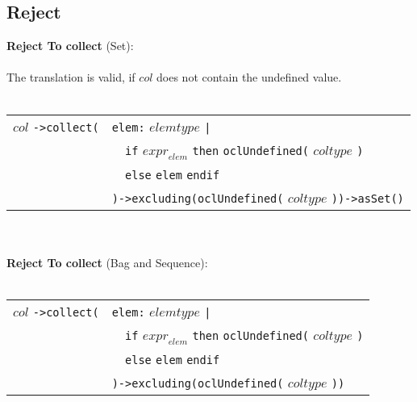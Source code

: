 \subsection{Reject}
{\bf Reject To collect} (Set):\\\\
The translation is valid, if $\mathit{col}$ does not
contain the undefined value.\\\\
\begin{tabular}{ll}
$\mathit{col}$ \verb+->collect(+&
\verb+elem+\verb+:+ $\mathit{elemtype}$ \verb+|+\\
&\verb+  +\verb+if+ $\mathit{expr}_{\mathit{elem}}$ \verb+then+
\verb+oclUndefined(+
$\mathit{coltype}$ \verb+)+\\
&\verb+  +\verb+else+ \verb+elem+ \verb+endif+\\
&\hspace{-2.63mm}\verb+)->excluding(oclUndefined(+
$\mathit{coltype}$ \verb+))->asSet()+
\end{tabular}\\\\
{\bf Reject To collect} (Bag and Sequence):\\\\
\begin{tabular}{ll}
$\mathit{col}$ \verb+->collect(+&
\verb+elem+\verb+:+ $\mathit{elemtype}$ \verb+|+\\
&\verb+  +\verb+if+ $\mathit{expr}_{\mathit{elem}}$ \verb+then+
\verb+oclUndefined(+
$\mathit{coltype}$ \verb+)+\\
&\verb+  +\verb+else+ \verb+elem+ \verb+endif+\\
&\hspace{-2.63mm}\verb+)->excluding(oclUndefined(+
$\mathit{coltype}$ \verb+))+
\end{tabular}
